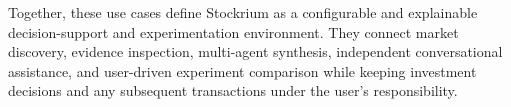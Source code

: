 Together, these use cases define Stockrium as a configurable and explainable decision-support and experimentation environment. They connect market discovery, evidence inspection, multi-agent synthesis, independent conversational assistance, and user-driven experiment comparison while keeping investment decisions and any subsequent transactions under the user's responsibility.
